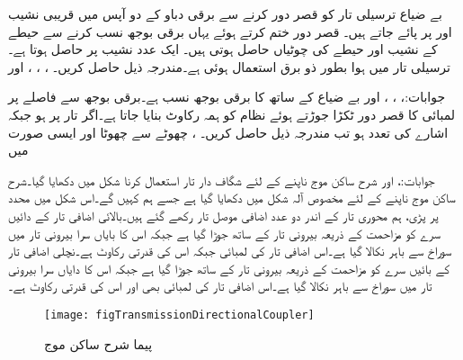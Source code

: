 بے ضیاع  ترسیلی تار کو قصر دور کرنے سے برقی دباو کے دو آپس میں قریبی نشیب  اور  پر پائے جاتے ہیں۔ قصر دور ختم کرتے ہوئے یہاں برقی بوجھ نسب کرنے سے  حیطے کے نشیب اور  حیطے کی چوٹیاں حاصل ہوتی ہیں۔ ایک عدد نشیب  پر حاصل ہوتا ہے۔ترسیلی تار میں ہوا بطور ذو برق استعمال ہوئی ہے۔مندرجہ ذیل حاصل کریں۔ ، ، ،  اور 

جوابات:، ، ،
  اور 
بے ضیاع  کے ساتھ  کا برقی بوجھ نسب ہے۔برقی بوجھ سے  فاصلے پر  لمبائی کا قصر دور ٹکڑا جوڑتے ہوئے نظام کو ہمہ رکاوٹ بنایا جاتا ہے۔اگر تار پر  ہو جبکہ اشارے کی تعدد  ہو تب مندرجہ ذیل حاصل کریں۔ ، چھوٹے سے چھوٹا  اور ایسی صورت میں 

جوابات:،  اور 
شرح ساکن موج ناپنے کے لئے شگاف دار تار استعمال کرنا شکل  میں دکھایا گیا۔شرح ساکن موج ناپنے کے لئے مخصوص آلہ شکل  میں دکھایا گیا ہے جسے ہم  کہیں گے۔اس شکل میں  محدد پر پڑی، ہم محوری تار کے اندر دو عدد اضافی موصل تار رکھے گئے ہیں۔بالائی اضافی تار کے دائیں سرے کو مزاحمت  کے ذریعہ بیرونی تار کے ساتھ جوڑا گیا ہے جبکہ اس کا بایاں سرا بیرونی تار میں سوراخ سے باہر نکالا گیا ہے۔اس اضافی تار کی لمبائی  جبکہ اس کی قدرتی رکاوٹ  ہے۔نچلی اضافی تار کے بائیں سرے کو مزاحمت  کے ذریعہ بیرونی تار کے ساتھ جوڑا گیا ہے جبکہ اس کا دایاں سرا بیرونی تار میں سوراخ سے باہر نکالا گیا ہے۔اس اضافی تار کی لمبائی بھی  اور اس کی قدرتی رکاوٹ  ہے۔

\begin{figure}
\centering
\texttt{[image: figTransmissionDirectionalCoupler]}
\caption{پیما شرح ساکن موج}
\label{شکل_ترسیلی_آلہ_پیما_شرح_ساکن_موج}
\end{figure}

